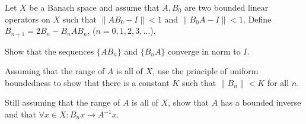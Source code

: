Let $X$ be a Banach space and assume that $A,B_0$ are two bounded
linear operators on $X$ such that $\|AB_0-I\|<1$ and $\|B_0A-I\|<1$.
Define $B_{n+1}=2B_n-B_n AB_n$, ($n=0,1,2,3,\ldots $).
\begin{alist}
\item Show that the sequences $\{A B_n\}$ and $\{B_nA\}$ converge in
norm to $I$.
\item Assuming that the range of $A$ is all of $X$, use the principle
of uniform boundedness to show that there is a constant $K$ such that
$\|B_n\|<K$ for all $n$.
\item Still assuming that the range of $A$ is all of $X$, show that
$A$ has a bounded inverse and that $\forall x\in X:B_nx\rightarrow
A^{-1}x$.
\end{alist}
